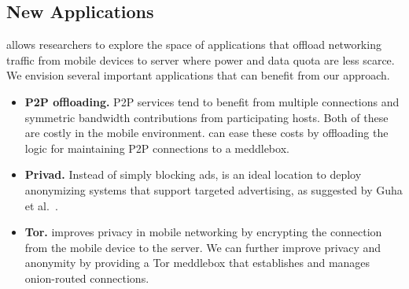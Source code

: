 \subsection{New Applications}

\meddle allows researchers to explore the space of applications that offload 
networking traffic from mobile devices to server where power and data quota 
are less scarce. We envision several important applications that can benefit 
from our approach.

\begin{itemize}
\item \textbf{P2P offloading.} P2P services tend to benefit from multiple connections 
and symmetric bandwidth contributions from participating hosts. Both of these are 
costly in the mobile environment. \meddle can ease these costs by offloading the 
logic for maintaining P2P connections to a meddlebox.
\item \textbf{Privad.}  Instead of simply blocking ads, \meddle is an ideal location 
to deploy anonymizing systems that support targeted advertising, as suggested by 
Guha et al.~\cite{guha:privad}. 
\item \textbf{Tor.} \meddle improves privacy in mobile networking by encrypting the 
connection from the mobile device to the \meddle server. We can further improve 
privacy and anonymity by providing a Tor meddlebox that establishes and manages 
onion-routed connections.

\end{itemize}


